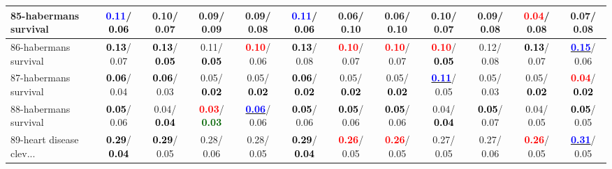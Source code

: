 \begin{table}[h]
\begin{center}
{\begin{tabular}{lc|c|c|c|c|c|c|c|c|c|c}
85-habermans survival & \textcolor{blue}{\textbf{  0.11}}/\textcolor{black}{\textbf{  0.06}} &   0.10/  0.07 &   0.09/  0.09 &   0.09/  0.08 & \textcolor{blue}{\textbf{  0.11}}/\textcolor{black}{\textbf{  0.06}} &   0.06/  0.10 &   0.06/  0.10 &   0.10/  0.07 &   0.09/  0.08 & \textcolor{red}{\textbf{  0.04}}/  0.08 &   0.07/  0.08 \\ \hline
86-habermans survival & \textcolor{black}{\textbf{  0.13}}/  0.07 & \textcolor{black}{\textbf{  0.13}}/\textcolor{black}{\textbf{  0.05}} &   0.11/\textcolor{black}{\textbf{  0.05}} & \textcolor{red}{\textbf{  0.10}}/  0.06 & \textcolor{black}{\textbf{  0.13}}/  0.08 & \textcolor{red}{\textbf{  0.10}}/  0.07 & \textcolor{red}{\textbf{  0.10}}/  0.07 & \textcolor{red}{\textbf{  0.10}}/\textcolor{black}{\textbf{  0.05}} &   0.12/  0.08 & \textcolor{black}{\textbf{  0.13}}/  0.07 & \underline{\textcolor{blue}{\textbf{  0.15}}}/  0.06 \\
87-habermans survival & \textcolor{black}{\textbf{  0.06}}/  0.04 & \textcolor{black}{\textbf{  0.06}}/  0.03 &   0.05/\textcolor{black}{\textbf{  0.02}} &   0.05/\textcolor{black}{\textbf{  0.02}} & \textcolor{black}{\textbf{  0.06}}/\textcolor{black}{\textbf{  0.02}} &   0.05/\textcolor{black}{\textbf{  0.02}} &   0.05/\textcolor{black}{\textbf{  0.02}} & \underline{\textcolor{blue}{\textbf{  0.11}}}/  0.05 &   0.05/  0.03 &   0.05/\textcolor{black}{\textbf{  0.02}} & \textcolor{red}{\textbf{  0.04}}/\textcolor{black}{\textbf{  0.02}} \\
88-habermans survival & \textcolor{black}{\textbf{  0.05}}/  0.06 &   0.04/\textcolor{black}{\textbf{  0.04}} & \textcolor{red}{\textbf{  0.03}}/\textcolor{darkgreen}{\textbf{  0.03}} & \underline{\textcolor{blue}{\textbf{  0.06}}}/  0.06 & \textcolor{black}{\textbf{  0.05}}/  0.06 & \textcolor{black}{\textbf{  0.05}}/  0.06 & \textcolor{black}{\textbf{  0.05}}/  0.06 &   0.04/\textcolor{black}{\textbf{  0.04}} & \textcolor{black}{\textbf{  0.05}}/  0.07 &   0.04/  0.05 & \textcolor{black}{\textbf{  0.05}}/  0.05 \\
89-heart disease clev... & \textcolor{black}{\textbf{  0.29}}/\textcolor{black}{\textbf{  0.04}} & \textcolor{black}{\textbf{  0.29}}/  0.05 &   0.28/  0.06 &   0.28/  0.05 & \textcolor{black}{\textbf{  0.29}}/\textcolor{black}{\textbf{  0.04}} & \textcolor{red}{\textbf{  0.26}}/  0.05 & \textcolor{red}{\textbf{  0.26}}/  0.05 &   0.27/  0.05 &   0.27/  0.06 & \textcolor{red}{\textbf{  0.26}}/  0.05 & \underline{\textcolor{blue}{\textbf{  0.31}}}/  0.05 \\

\end{tabular}}
\end{center}
\end{table}
